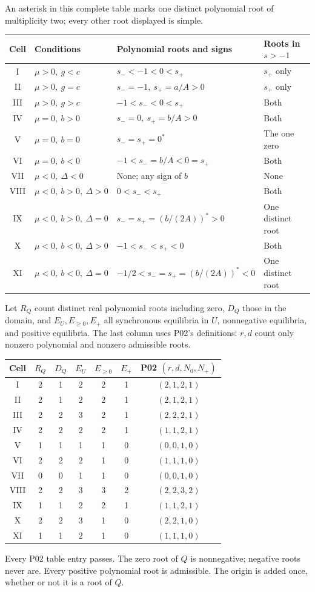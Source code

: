 \documentclass[11pt]{article}
\begin{document}
An asterisk in this complete table marks one distinct polynomial root
of multiplicity two; every other root displayed is simple.
\begin{longtable}{@{}c P{0.25\textwidth}P{0.36\textwidth}P{0.23\textwidth}@{}}
\toprule
Cell & Conditions & Polynomial roots and signs & Roots in \(s>-1\)\\
\midrule
\endhead
I & \(\mu>0,\ g<c\) & \(s_-<-1<0<s_+\) & \(s_+\) only\\
II & \(\mu>0,\ g=c\) & \(s_-=-1,\ s_+=a/A>0\) & \(s_+\) only\\
III & \(\mu>0,\ g>c\) & \(-1<s_-<0<s_+\) & Both\\
IV & \(\mu=0,\ b>0\) & \(s_-=0,\ s_+=b/A>0\) & Both\\
V & \(\mu=0,\ b=0\) & \(s_-=s_+=0^*\) & The one zero\\
VI & \(\mu=0,\ b<0\) & \(-1<s_-=b/A<0=s_+\) & Both\\
VII & \(\mu<0,\ \Delta<0\) & None; any sign of \(b\) & None\\
VIII & \(\mu<0,\ b>0,\ \Delta>0\) & \(0<s_-<s_+\) & Both\\
IX & \(\mu<0,\ b>0,\ \Delta=0\) & \(s_-=s_+=(b/(2A))^*>0\) & One distinct root\\
X & \(\mu<0,\ b<0,\ \Delta>0\) & \(-1<s_-<s_+<0\) & Both\\
XI & \(\mu<0,\ b<0,\ \Delta=0\) & \(-1/2<s_-=s_+=(b/(2A))^*<0\) & One distinct root\\
\bottomrule
\end{longtable}

Let \(R_Q\) count distinct real polynomial roots including zero,
\(D_Q\) those in the domain, and \(E_U,E_{\ge0},E_+\) all synchronous
equilibria in \(U\), nonnegative equilibria, and positive equilibria.
The last column uses P02's definitions: \(r,d\) count only nonzero
polynomial and nonzero admissible roots.
\begin{center}
\begin{tabular}{@{}c c c c c c c@{}}
\toprule
Cell & \(R_Q\)&\(D_Q\)&\(E_U\)&\(E_{\ge0}\)&\(E_+\)&P02 \((r,d,N_0,N_+)\)\\
\midrule
I&2&1&2&2&1&\((2,1,2,1)\)\\
II&2&1&2&2&1&\((2,1,2,1)\)\\
III&2&2&3&2&1&\((2,2,2,1)\)\\
IV&2&2&2&2&1&\((1,1,2,1)\)\\
V&1&1&1&1&0&\((0,0,1,0)\)\\
VI&2&2&2&1&0&\((1,1,1,0)\)\\
VII&0&0&1&1&0&\((0,0,1,0)\)\\
VIII&2&2&3&3&2&\((2,2,3,2)\)\\
IX&1&1&2&2&1&\((1,1,2,1)\)\\
X&2&2&3&1&0&\((2,2,1,0)\)\\
XI&1&1&2&1&0&\((1,1,1,0)\)\\
\bottomrule
\end{tabular}
\end{center}
Every P02 table entry passes. The zero root of \(Q\) is nonnegative;
negative roots never are. Every positive polynomial root is admissible.
The origin is added once, whether or not it is a root of \(Q\).
\end{document}
